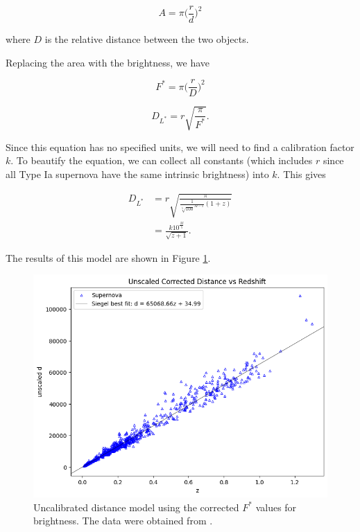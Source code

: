 \documentclass{article}
\begin{document}
\begin{equation}
  A = \pi \bigg(\frac{r}{d}\bigg)^2
\end{equation}

where $D$ is the relative distance between the two objects.

Replacing the area with the brightness, we have

\begin{equation*}
  F^{*} = \pi \bigg(\frac{r}{D}\bigg)^2
\end{equation*}

\begin{equation}
\label{eq:D*}
  D_{L^*} = r \sqrt{\frac{\pi}{F^*}}.
\end{equation}

Since this equation has no specified units, we will need to find a
calibration factor $k$. To beautify the equation, we can collect all constants
(which includes $r$ since all Type Ia supernova have the same intrinsic
brightness) into $k$. This gives

\begin{equation}
\begin{aligned}
  D_{L^*} &= r \sqrt{\frac{\pi}{\frac{1}{\sqrt[5]{100}^{M - 1}}(1 + z)}} \\
          &= \frac{k 10^\frac{M}{5}}{\sqrt{z + 1}}.
\end{aligned}
\end{equation}

The results of this model are shown in Figure \ref{fig:corrected_uncalibrated}.

\begin{figure}[h!]
  \includegraphics[width=\linewidth]{../graphs/corrected_uncalibrated.png}
  \caption{Uncalibrated distance model using the corrected $F^*$ values for
  brightness. The data were obtained from \citet{betoule2014}.}
  \label{fig:corrected_uncalibrated}
\end{figure}
\end{document}
